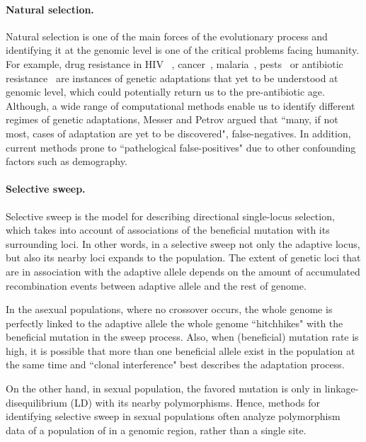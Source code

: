 \documentclass[11pt]{article}
\begin{document}
\paragraph{Natural selection.} Natural selection is one of the main forces of 
the evolutionary 
process and 
identifying it at the genomic level is one of the critical problems facing 
humanity.
For example, drug resistance in HIV ~\cite{Feder2016More}, 
cancer~\cite{gottesman2002mechanisms,zahreddine2013mechanisms},
malaria~\cite{ariey2014molecular,nair2007recurrent},
pests~\cite{daborn2001ddt} or antibiotic 
resistance~\cite{spellberg2008epidemic} are instances of genetic adaptations 
that yet to be 
understood at genomic level, which could potentially return us to the 
pre-antibiotic age.
Although, a wide range of computational methods \cite{vitti2013detecting} 
enable us to identify different regimes of genetic adaptations, Messer 
and Petrov 
\cite{messer2013population} argued that ``many, if not most, cases of 
adaptation are yet to be discovered", false-negatives. In addition, current 
methods prone to ``pathelogical false-positives" due to other confounding 
factors such as demography.


\paragraph{Selective sweep.} Selective sweep 
\cite{smith1974hitch,kaplan1989hitchhiking} is the 
model for describing directional single-locus selection, which takes into 
account of associations of the beneficial mutation with its surrounding loci.
In other words, in a selective sweep not only the adaptive locus, but also its 
nearby loci expands to the population.
The extent of genetic loci that are in association with the adaptive allele 
depends on the amount of accumulated recombination events between adaptive 
allele and the rest of genome. 

In the asexual populations, where no 
crossover occurs, the whole genome is perfectly linked to the 
adaptive allele the whole genome ``hitchhikes" with the beneficial mutation in 
the sweep process.
Also, when (beneficial) mutation rate is high, it is possible that more than 
one beneficial allele exist in the population at the same time and ``clonal 
interference" \cite{desai2007beneficial,lang2013pervasive} 
best describes the adaptation process.

On the other hand, in sexual population, the favored mutation is only in 
linkage-disequilibrium (LD) with its nearby polymorphisms. Hence, methods for 
identifying selective 
sweep in sexual populations often analyze  polymorphism data of a population of 
in a genomic region, rather than a single site. 
\end{document}
